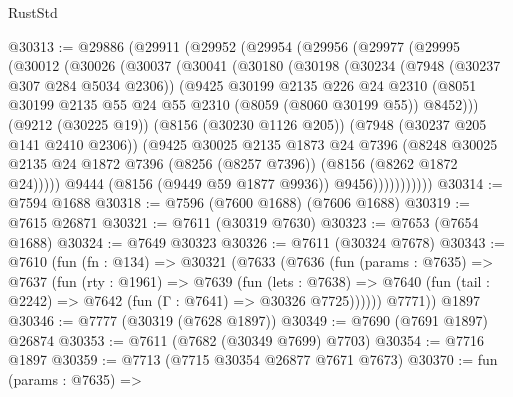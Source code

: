 \begin{lexlean}{RustStd}
\begin{coremodule}
{\begin{coremodule}
{{{{{{{{{{{{{{{{{{{{{{{{{{{{{{{{{{@30313 := @29886
    (@29911
      (@29952
        (@29954
          (@29956
            (@29977
              (@29995
                (@30012
                  (@30026
                    (@30037
                      (@30041
                        (@30180
                          (@30198
                            (@30234
                              (@7948 (@30237 @307 @284 @5034 @2306))
                              (@9425
                                @30199
                                @2135
                                @226
                                @24
                                @2310
                                (@8051
                                  @30199
                                  @2135
                                  @55
                                  @24
                                  @55
                                  @2310
                                  (@8059 (@8060 @30199 @55))
                                  @8452)))
                            (@9212 (@30225 @19))
                            (@8156 (@30230 @1126 @205))
                            (@7948 (@30237 @205 @141 @2410 @2306))
                            (@9425
                              @30025
                              @2135
                              @1873
                              @24
                              @7396
                              (@8248
                                @30025
                                @2135
                                @24
                                @1872
                                @7396
                                (@8256 (@8257 @7396))
                                (@8156 (@8262 @1872 @24)))))
                          @9444
                          (@8156 (@9449 @59 @1877 @9936))
                          @9456)))))))))))
@30314 := @7594 @1688
@30318 := @7596 (@7600 @1688) (@7606 @1688)
@30319 := @7615 @26871
@30321 := @7611 (@30319 @7630)
@30323 := @7653 (@7654 @1688)
@30324 := @7649 @30323
@30326 := @7611 (@30324 @7678)
@30343 := @7610
    (fun (fn : @134) =>
    @30321
      (@7633
        (@7636
          (fun (params : @7635) =>
          @7637
            (fun (rty : @1961) =>
            @7639
              (fun (lets : @7638) =>
              @7640 (fun (tail : @2242) => @7642 (fun (Γ : @7641) => @30326 @7725))))))
        @7771))
    @1897
@30346 := @7777 (@30319 (@7628 @1897))
@30349 := @7690 (@7691 @1897) @26874
@30353 := @7611 (@7682 (@30349 @7699) @7703)
@30354 := @7716 @1897
@30359 := @7713 (@7715 @30354 @26877 @7671 @7673)
@30370 := fun (params : @7635) =>
}}}}}}}}}}}}}}}}}}}}}}}}}}}}}}}}}}
\end{coremodule}}
\end{coremodule}
\end{lexlean}
